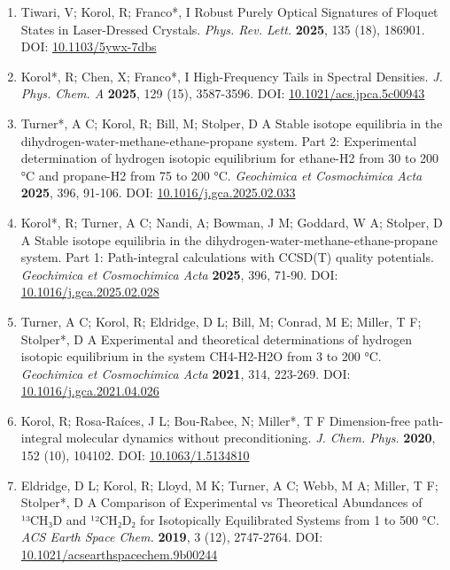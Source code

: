 
\begin{enumerate}
\item[14.] Tiwari, V; Korol, R; Franco*, I Robust Purely Optical Signatures of Floquet States in Laser-Dressed Crystals. \textit{Phys. Rev. Lett.} \textbf{2025}, 135 (18), 186901. DOI: \href{https://doi.org/10.1103/5ywx-7dbs}{10.1103/5ywx-7dbs}
\vspace{0.1cm}
\item[13.] Korol*, R; Chen, X; Franco*, I High-Frequency Tails in Spectral Densities. \textit{J. Phys. Chem. A} \textbf{2025}, 129 (15), 3587-3596. DOI: \href{https://doi.org/10.1021/acs.jpca.5c00943}{10.1021/acs.jpca.5c00943}
\vspace{0.1cm}
\item[12.] Turner*, A C; Korol, R; Bill, M; Stolper, D A Stable isotope equilibria in the dihydrogen-water-methane-ethane-propane system. Part 2: Experimental determination of hydrogen isotopic equilibrium for ethane-H2 from 30 to 200 °C and propane-H2 from 75 to 200 °C. \textit{Geochimica et Cosmochimica Acta} \textbf{2025}, 396, 91-106. DOI: \href{https://doi.org/10.1016/j.gca.2025.02.033}{10.1016/j.gca.2025.02.033}
\vspace{0.1cm}
\item[11.] Korol*, R; Turner, A C; Nandi, A; Bowman, J M; Goddard, W A; Stolper, D A Stable isotope equilibria in the dihydrogen-water-methane-ethane-propane system. Part 1: Path-integral calculations with CCSD(T) quality potentials. \textit{Geochimica et Cosmochimica Acta} \textbf{2025}, 396, 71-90. DOI: \href{https://doi.org/10.1016/j.gca.2025.02.028}{10.1016/j.gca.2025.02.028}
\vspace{0.1cm}
\item[10.] Turner, A C; Korol, R; Eldridge, D L; Bill, M; Conrad, M E; Miller, T F; Stolper*, D A Experimental and theoretical determinations of hydrogen isotopic equilibrium in the system CH4-H2-H2O from 3 to 200 °C. \textit{Geochimica et Cosmochimica Acta} \textbf{2021}, 314, 223-269. DOI: \href{https://doi.org/10.1016/j.gca.2021.04.026}{10.1016/j.gca.2021.04.026}
\vspace{0.1cm}
\item[9.] Korol, R; Rosa-Raíces, J L; Bou-Rabee, N; Miller*, T F Dimension-free path-integral molecular dynamics without preconditioning. \textit{J. Chem. Phys.} \textbf{2020}, 152 (10), 104102. DOI: \href{https://doi.org/10.1063/1.5134810}{10.1063/1.5134810}
\vspace{0.1cm}
\item[8.] Eldridge, D L; Korol, R; Lloyd, M K; Turner, A C; Webb, M A; Miller, T F; Stolper*, D A Comparison of Experimental vs Theoretical Abundances of ¹³CH₃D and ¹²CH₂D₂ for Isotopically Equilibrated Systems from 1 to 500 °C. \textit{ACS Earth Space Chem.} \textbf{2019}, 3 (12), 2747-2764. DOI: \href{https://doi.org/10.1021/acsearthspacechem.9b00244}{10.1021/acsearthspacechem.9b00244}

\end{enumerate}
